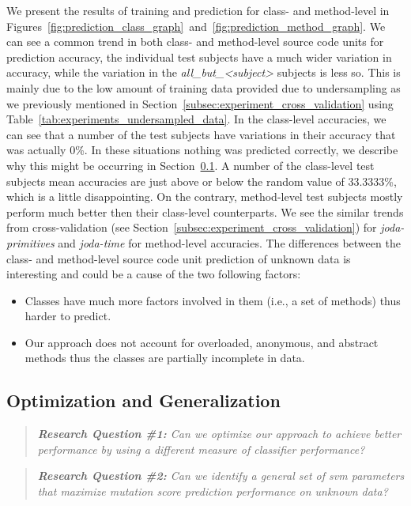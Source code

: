 We present the results of training and prediction for class- and method-level in Figures~\ref{fig:prediction_class_graph}~and~\ref{fig:prediction_method_graph}. We can see a common trend in both class- and method-level source code units for prediction accuracy, the individual test subjects have a much wider variation in accuracy, while the variation in the \emph{all\_but\_<subject>} subjects is less so. This is mainly due to the low amount of training data provided due to undersampling as we previously mentioned in Section~\ref{subsec:experiment_cross_validation} using Table~\ref{tab:experiments_undersampled_data}. In the class-level accuracies, we can see that a number of the test subjects have variations in their accuracy that was actually 0\%. In these situations nothing was predicted correctly, we describe why this might be occurring in Section~\ref{subsec:experiment_optimization_generalization}. A number of the class-level test subjects mean accuracies are just above or below the random value of 33.3333\%, which is a little disappointing. On the contrary, method-level test subjects mostly perform much better then their class-level counterparts. We see the similar trends from cross-validation (see Section~\ref{subsec:experiment_cross_validation}) for \emph{joda-primitives} and \emph{joda-time} for method-level accuracies. The differences between the class- and method-level source code unit prediction of unknown data is interesting and could be a cause of the two following factors:

\begin{itemize}
  \item Classes have much more factors involved in them (i.e., a set of methods) thus harder to predict.
  \item Our approach does not account for overloaded, anonymous, and abstract methods thus the classes are partially incomplete in data.
\end{itemize}


\subsection{Optimization and Generalization}
\label{subsec:experiment_optimization_generalization}
\begin{quote}
  \emph{\textbf{Research Question \#1:} Can we optimize our approach to achieve better performance by using a different measure of classifier performance?}
\end{quote}

\begin{quote}
  \emph{\textbf{Research Question \#2:} Can we identify a general set of \gls{svm} parameters that maximize mutation score prediction performance on unknown data?}
\end{quote}

